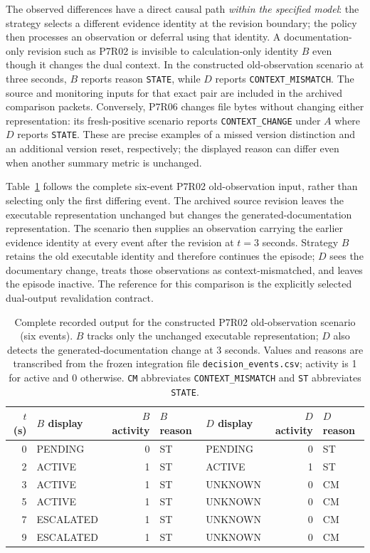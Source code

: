 \documentclass[preprint,11pt]{elsarticle}
\newcommand{\code}[1]{\texttt{#1}}
\begin{document}
The observed differences have a direct causal path \emph{within the specified model}: the strategy selects a different evidence identity at the revision boundary; the policy then processes an observation or deferral using that identity. A documentation-only revision such as P7R02 is invisible to calculation-only identity $B$ even though it changes the dual context. In the constructed old-observation scenario at three seconds, $B$ reports reason \code{STATE}, while $D$ reports \code{CONTEXT\_MISMATCH}. The source and monitoring inputs for that exact pair are included in the archived comparison packets. Conversely, P7R06 changes file bytes without changing either representation: its fresh-positive scenario reports \code{CONTEXT\_CHANGE} under $A$ where $D$ reports \code{STATE}. These are precise examples of a missed version distinction and an additional version reset, respectively; the displayed reason can differ even when another summary metric is unchanged.


Table~\ref{tab:source-bridge-witness} follows the complete six-event P7R02 old-observation input, rather than selecting only the first differing event. The archived source revision leaves the executable representation unchanged but changes the generated-documentation representation. The scenario then supplies an observation carrying the earlier evidence identity at every event after the revision at $t=3$ seconds. Strategy $B$ retains the old executable identity and therefore continues the episode; $D$ sees the documentary change, treats those observations as context-mismatched, and leaves the episode inactive. The reference for this comparison is the explicitly selected dual-output revalidation contract.

\begin{table}[ht]
\centering\small
\caption{Complete recorded output for the constructed P7R02 old-observation scenario (six events). $B$ tracks only the unchanged executable representation; $D$ also detects the generated-documentation change at 3 seconds. Values and reasons are transcribed from the frozen integration file \code{decision\_events.csv}; activity is 1 for active and 0 otherwise. \code{CM} abbreviates \code{CONTEXT\_MISMATCH} and \code{ST} abbreviates \code{STATE}.}\label{tab:source-bridge-witness}
\begin{tabular}{@{}rlrllrl@{}}\toprule
$t$ (s) & $B$ display & $B$ activity & $B$ reason & $D$ display & $D$ activity & $D$ reason \\\midrule
0 & PENDING & 0 & ST & PENDING & 0 & ST \\
2 & ACTIVE & 1 & ST & ACTIVE & 1 & ST \\
3 & ACTIVE & 1 & ST & UNKNOWN & 0 & CM \\
5 & ACTIVE & 1 & ST & UNKNOWN & 0 & CM \\
7 & ESCALATED & 1 & ST & UNKNOWN & 0 & CM \\
9 & ESCALATED & 1 & ST & UNKNOWN & 0 & CM \\\bottomrule
\end{tabular}
\end{table}
\end{document}

